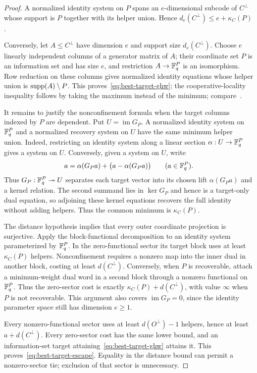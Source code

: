 \begin{proof}
A normalized identity system on $P$ spans an $e$-dimensional subcode of
$C^\perp$ whose support is $P$ together with its helper union.  Hence
$d_e(C^\perp)\leq e+\kappa_C(P)$.

Conversely, let $A\leq C^\perp$ have dimension $e$ and support size
$d_e(C^\perp)$.  Choose $e$ linearly independent columns of a generator
matrix of $A$; their coordinate set $P$ is an information set and has
size $e$, and restriction $A\to\mathbb F_q^P$ is an isomorphism.  Row reduction on
these columns gives normalized identity equations whose helper union is
$\operatorname{supp}(A)\setminus P$.  This proves~\eqref{eq:best-target-ghw}; the
cooperative-locality inequality follows by taking the maximum instead of the
minimum; compare~\cite[Theorem~1]{AbdelGhaffarWeber2017}.

It remains to justify the nonconfinement formula when the target columns indexed by
$P$ are dependent.  Put $U=\operatorname{im}G_P$.  A normalized identity
system on $\mathbb F_q^P$ and a normalized recovery system on $U$ have the same
minimum helper union.  Indeed, restricting an identity system along a linear
section $\alpha:U\to\mathbb F_q^P$ gives a system on $U$.  Conversely, given a
system on $U$, write
\[
a=\alpha(G_Pa)+\bigl(a-\alpha(G_Pa)\bigr)
 \qquad(a\in\mathbb F_q^P).
\]
Thus $G_P:\mathbb F_q^P\twoheadrightarrow U$ separates each target vector into its
chosen lift $\alpha(G_Pa)$ and a kernel relation.
The second summand lies in $\ker G_P$ and hence is a target-only dual
equation, so adjoining these kernel equations recovers the full identity
without adding helpers.  Thus the common minimum is $\kappa_C(P)$.

The distance hypothesis implies that every outer coordinate projection is
surjective.  Apply the block-functional decomposition to an identity system
parameterized by $\mathbb F_q^P$.  In the zero-functional sector its target block
uses at least $\kappa_C(P)$ helpers.  Nonconfinement requires a nonzero map
into the inner dual in another block, costing at least $d(C^\perp)$.
Conversely, when $P$ is recoverable, attach a minimum-weight dual word in a
second block through a nonzero functional on $\mathbb F_q^P$.  Thus the zero-sector
cost is exactly $\kappa_C(P)+d(C^\perp)$, with value $\infty$ when $P$
is not recoverable.  This argument also covers $\operatorname{im}G_P=0$,
since the identity parameter space still has dimension $e\geq1$.

Every nonzero-functional sector uses at least $d(O^\perp)-1$ helpers, hence
at least $a+d(C^\perp)$.  Every zero-sector cost has the same lower bound,
and an information-set target attaining~\eqref{eq:best-target-ghw} attains it.
This proves~\eqref{eq:best-target-escape}.  Equality in the distance bound
can permit a nonzero-sector tie; exclusion of that sector is unnecessary.
%
%
\end{proof}

